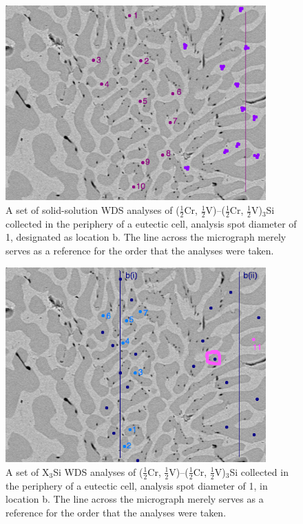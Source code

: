 \begin{figure}[H]
\begin{center}
\includegraphics[width=10cm]{g05bSS}
\caption{A set of solid-solution WDS analyses of ($\frac{1}{2}$Cr, $\frac{1}{2}$V)--($\frac{1}{2}$Cr, $\frac{1}{2}$V)$_3$Si collected in the periphery of a eutectic cell, analysis spot diameter of 1\micro\metre, designated as location b.  The line across the micrograph merely serves as a reference for the order that the analyses were taken.}
\label{fig:g05bSS}
\end{center}
\end{figure}
%
%
\begin{figure}[H]
\begin{center}
\includegraphics[width=10cm]{g05bX3Si}
\caption{A set of X$_3$Si WDS analyses of ($\frac{1}{2}$Cr, $\frac{1}{2}$V)--($\frac{1}{2}$Cr, $\frac{1}{2}$V)$_3$Si collected in the periphery of a eutectic cell, analysis spot diameter of 1\micro\metre, in location b.  The line across the micrograph merely serves as a reference for the order that the analyses were taken.}
\label{fig:g05bX3Si}
\end{center}
\end{figure}
%

